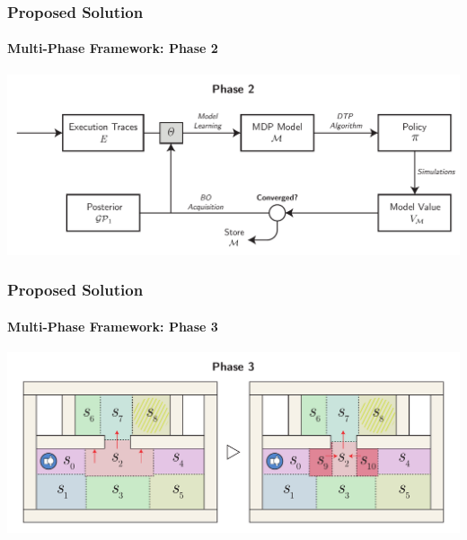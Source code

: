 \begin{frame}
	\frametitle{Proposed Solution}
	\framesubtitle{Multi-Phase Framework: Phase 2}
	
	\begin{center}
		\includegraphics[width=\textwidth]{figures/phase-2v3}
	\end{center}
	
\end{frame}

\begin{frame}
	\frametitle{Proposed Solution}
	\framesubtitle{Multi-Phase Framework: Phase 3}
	
	\begin{center}
		\includegraphics[width=\textwidth]{figures/phase-3}
	\end{center}
	
\end{frame}